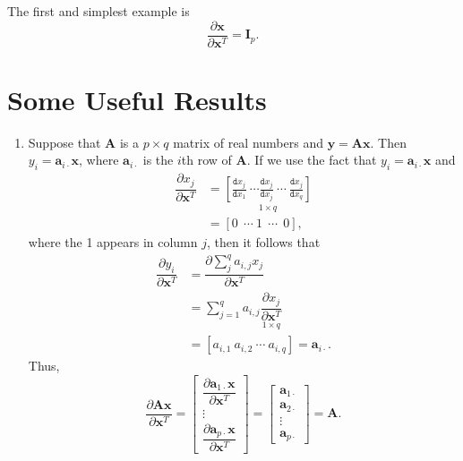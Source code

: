 \documentclass[graybox,envcountchap]{svmono}
\newcommand{\xf}{\mathbf{x}}
\newcommand{\yf}{\mathbf{y}}
\newcommand{\tx}{\texttt}
\begin{document}
The first and simplest example is 
\begin{equation*}\label{eq:dxdx}
  \dfrac{\partial \xf}{\partial \xf^T} = \mathbf{I}_p.
\end{equation*}

\section{Some Useful Results}

\begin{enumerate}
\item Suppose that $\mathbf{A}$ is a $p \times q$ matrix of real numbers and $\yf = \mathbf{A}\xf$. Then $y_i = \mathbf{a}_{i\cdot} \xf$, where $\mathbf{a}_{i\cdot}$ is the $i$th row of $\mathbf{A}$.  If we use the fact that $y_i = \mathbf{a}_{i \cdot} \xf$ and 
\begin{equation}
\begin{align}
 \dfrac{\partial  x_j}{\partial \xf^T} &= \underset{1 \times q}{\left[ \frac{\tx{d}x_j}{\tx{d}x_1} \ \cdots \frac{\tx{d}x_j}{\tx{d}x_j} \ \cdots \ \frac{\tx{d}x_j}{\tx{d}x_q}  \right]} \\
 & = \left[0 \ \  \cdots \ 1 \ \ \cdots \ \ 0 \right],
\end{align}
\end{equation}
where the 1 appears in column $j$, then it follows that 
\begin{equation}
 \begin{align}
  \dfrac{\partial y_i}{\partial \xf^T} &= \dfrac{\partial \sum_j^q a_{i,j}x_j}{\partial \xf^T} \\
   &= \sum_{j=1}^q a_{i,j}\underset{1 \times q}{\dfrac{\partial  x_j}{\partial \xf^T} } \\
  &=  \left[a_{i,1} \ a_{i,2} \ \cdots \ a_{i,q}\right] = \mathbf{a}_{i \cdot }.
 \end{align}
\end{equation}
Thus,
\begin{equation}
 \dfrac{\partial \mathbf{A} \xf }{\partial \xf^T} = 
 \left[ \begin{array}{c} \dfrac{\partial \mathbf{a}_{1\cdot} \xf}{\partial \xf^T}  \\  \vdots \\ 
 \dfrac{\partial \mathbf{a}_{p\cdot} \xf}{\partial \xf^T}  
 \end{array} \right]  
 = \left[ \begin{array}{c} \mathbf{a}_{1\cdot} \\ \mathbf{a}_{2\cdot} \\ \vdots \\\mathbf{a}_{p\cdot} 
 \end{array} \right]  = \mathbf{A}.
\end{equation}


\end{enumerate}
\end{document}
